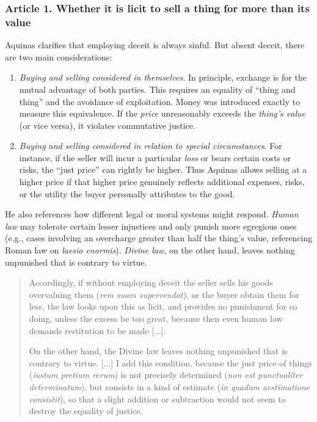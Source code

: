         \subsubsection{Article 1. Whether it is licit to sell a thing for more than its value}

            Aquinas clarifies that employing deceit is always sinful. But absent deceit, there are two main considerations:
            
            \begin{enumerate}
                \item \emph{Buying and selling considered in themselves}. In principle, exchange is for the mutual advantage of both parties. This requires an equality of “thing and thing” and the avoidance of exploitation. Money was introduced exactly to measure this equivalence. If the \emph{price} unreasonably exceeds the \emph{thing’s value} (or vice versa), it violates commutative justice.
            
                \item \emph{Buying and selling considered in relation to special circumstances}. For instance, if the seller will incur a particular \emph{loss} or bears certain costs or risks, the “just price” can rightly be higher. Thus Aquinas allows selling at a higher price if that higher price genuinely reflects additional expenses, risks, or the utility the buyer personally attributes to the good.
            \end{enumerate}
            
            He also references how different legal or moral systems might respond. \emph{Human law} may tolerate certain lesser injustices and only punish more egregious ones (e.g., cases involving an overcharge greater than half the thing’s value, referencing Roman law on \textit{laesio enormis}). \emph{Divine law}, on the other hand, leaves nothing unpunished that is contrary to virtue. 

            \begin{quote}
                Accordingly, if without employing deceit the seller sells his goods overvaluing them (\textit{rem suam supervendat}), or the buyer obtain them for less, the law looks upon this as licit, and provides no punishment for so doing, unless the excess be too great, because then even human law demands restitution to be made [...]. 
                
                On the other hand, the Divine law leaves nothing unpunished that is contrary to virtue. [...] I add this condition, because the just price of things (\textit{iustum pretium rerum}) is not precisely determined (\textit{non est punctualiter determinatum}), but consists in a kind of estimate (\textit{in quadam aestimatione consistit}), so that a slight addition or subtraction would not seem to destroy the equality of justice.
            \end{quote}
            
